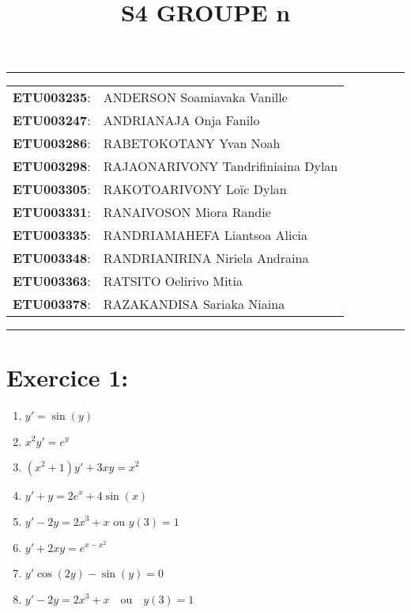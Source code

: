 \documentclass[a4paper,12pt]{article}
\begin{document}
	
\title{\textbf{S4 GROUPE n}}
\date{}
\maketitle

\hrule
\vspace{1em}

\begin{tabular}{rl}
	\textbf{ETU003235}: & ANDERSON Soamiavaka Vanille \\
	\textbf{ETU003247}: & ANDRIANAJA Onja Fanilo \\
	\textbf{ETU003286}: & RABETOKOTANY Yvan Noah \\
	\textbf{ETU003298}: & RAJAONARIVONY Tandrifiniaina Dylan \\
	\textbf{ETU003305}: & RAKOTOARIVONY Loïc Dylan \\
	\textbf{ETU003331}: & RANAIVOSON Miora Randie \\
	\textbf{ETU003335}: & RANDRIAMAHEFA Liantsoa Alicia \\
	\textbf{ETU003348}: & RANDRIANIRINA Niriela Andraina \\
	\textbf{ETU003363}: & RATSITO Oelirivo Mitia \\
	\textbf{ETU003378}: & RAZAKANDISA Sariaka Niaina \\
\end{tabular}

\vspace{1em}
\hrule

\newpage
\section*{Exercice 1:}
\begin{enumerate}
	\item $y' = \sin(y)$ \\

	\item $x^2 y' = e^y$ \\
	

	\item $(x^2 + 1) y' + 3xy = x^2$ \\
	
		
	\item $y' + y = 2e^x + 4 \sin(x)$ \\
	
	
	\item $y' - 2y = 2x^3 + x \text{ ou } y(3)=1$

	\item $y' + 2xy = e^{x-x^2}$

	\item $y' \cos(2y) - \sin(y) = 0$

	\item $y' - 2y = 2x^3 + x \quad \text{ou} \quad y(3)=1$
\end{enumerate}
\end{document}
